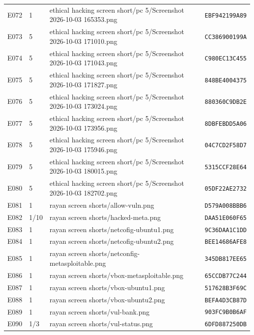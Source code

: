 \begin{longtable}{@{}L{1.1cm}L{1.1cm}L{8.0cm}L{1.5cm}L{3.6cm}@{}}
E072 & 1 & ethical hacking screen short/pc 5/Screenshot 2026-10-03 165353.png &  & \texttt{EBF942199A89} \\
E073 & 5 & ethical hacking screen short/pc 5/Screenshot 2026-10-03 171010.png &  & \texttt{CC386900199A} \\
E074 & 5 & ethical hacking screen short/pc 5/Screenshot 2026-10-03 171043.png &  & \texttt{C980EC13C455} \\
E075 & 5 & ethical hacking screen short/pc 5/Screenshot 2026-10-03 171827.png &  & \texttt{848BE4004375} \\
E076 & 5 & ethical hacking screen short/pc 5/Screenshot 2026-10-03 173024.png &  & \texttt{880360C9DB2E} \\
E077 & 5 & ethical hacking screen short/pc 5/Screenshot 2026-10-03 173956.png &  & \texttt{8DBFEBDD5A06} \\
E078 & 5 & ethical hacking screen short/pc 5/Screenshot 2026-10-03 175946.png &  & \texttt{04C7CD2F58D7} \\
E079 & 5 & ethical hacking screen short/pc 5/Screenshot 2026-10-03 180015.png &  & \texttt{5315CCF28E64} \\
E080 & 5 & ethical hacking screen short/pc 5/Screenshot 2026-10-03 182702.png &  & \texttt{05DF22AE2732} \\
E081 & 1 & rayan screen shorts/allow-vuln.png &  & \texttt{D579A008BBB6} \\
E082 & 1/10 & rayan screen shorts/hacked-meta.png &  & \texttt{DAA51E060F65} \\
E083 & 1 & rayan screen shorts/netcofig-ubuntu1.png &  & \texttt{9C36DAA1C1DD} \\
E084 & 1 & rayan screen shorts/netcofig-ubuntu2.png &  & \texttt{BEE14686AFE8} \\
E085 & 1 & rayan screen shorts/netconfig-metasploitable.png &  & \texttt{345DB817EE65} \\
E086 & 1 & rayan screen shorts/vbox-metasploitable.png &  & \texttt{65CCDB77C244} \\
E087 & 1 & rayan screen shorts/vbox-ubuntu1.png &  & \texttt{517628B3F69C} \\
E088 & 1 & rayan screen shorts/vbox-ubuntu2.png &  & \texttt{BEFA4D3CB87D} \\
E089 & 1 & rayan screen shorts/vul-bank.png &  & \texttt{903FC9B0B6AF} \\
E090 & 1/3 & rayan screen shorts/vul-status.png &  & \texttt{6DFD887250DB} \\
\bottomrule\end{longtable}\normalsize
